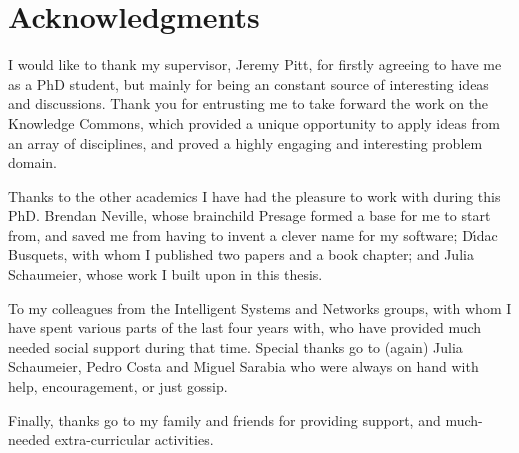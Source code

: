 
\begingroup
\let\clearpage\relax
\let\cleardoublepage\relax
\let\cleardoublepage\relax
\chapter*{Acknowledgments}


I would like to thank my supervisor, Jeremy Pitt, for firstly agreeing to have me
as a PhD student, but mainly for being an constant source of interesting ideas and discussions.
Thank you for entrusting me to take forward the work on the Knowledge
Commons, which provided a unique opportunity to apply ideas from an array of
disciplines, and proved a highly engaging and interesting problem domain.

Thanks to the other academics I have had the pleasure to work with during this
PhD. Brendan Neville, whose brainchild Presage formed a base for me to start
from, and saved me from having to invent a clever name for my software;
D\'{\i}dac Busquets, with whom I published two papers and a book chapter; and
Julia Schaumeier, whose work I built upon in this thesis.

To my colleagues from the Intelligent Systems and Networks groups, with whom I
have spent various parts of the last four years with, who have provided much
needed social support during that time. Special thanks go to (again) Julia
Schaumeier, Pedro Costa and Miguel Sarabia who were always on hand with help,
encouragement, or just gossip.

Finally, thanks go to my family and friends for providing support, and much-
needed extra-curricular activities.

\endgroup




